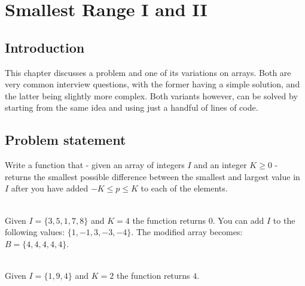 %



\chapter{Smallest Range \RN{1} and \RN{2}}
\label{ch:smallest_range}
\section*{Introduction}
This chapter discusses a problem and one of its variations on arrays. Both are very common interview
questions, with the former having a simple solution, and the latter being slightly more
complex. Both variants however, can be solved by starting from the same idea and using just a handful
of lines of code.

\section{Problem statement}
\begin{exercise}
\label{example:smallest_range:exercice1}
Write a function that  - given an array of integers $I$ and an integer $K \geq 0$  - returns the
smallest possible difference between the smallest and largest value in $I$ after you have added  $-K \leq p \leq K$ to
each of the elements.

	\begin{example}
		\label{example:smallest_range:example1}
		\hfill \\
		Given $I = \{3,5,1,7,8\}$ and $K=4$ the function returns $0$. You can add $I$ to the
		following values: $\{1,-1,3,-3,-4\}$. The modified array becomes: $B=\{4,4,4,4,4\}$. 
	\end{example}

	\begin{example}
		\label{example:smallest_range:example2}
		\hfill \\
		Given $I = \{1,9,4\}$ and $K=2$ the function returns $4$.
	\end{example} 
\end{exercise}

